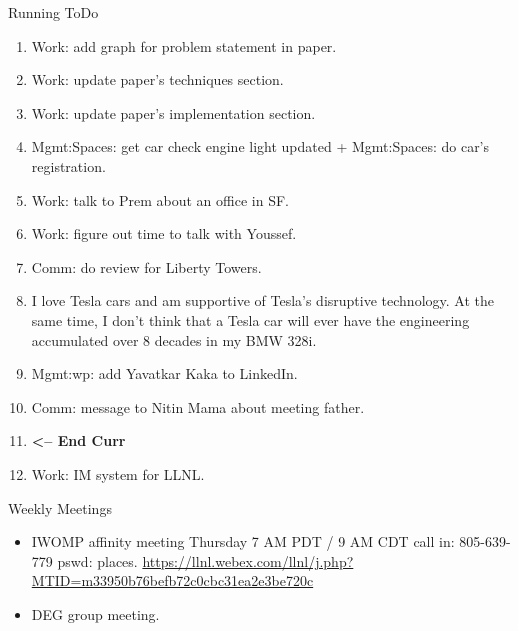 \begin{columns}
\begin{column}{0.5\linewidth}
\begin{block}{Running ToDo}
\begin{enumerate}
          \item \tiny Work: add graph for problem statement in paper. 
          \item \tiny Work: update paper's techniques section. 
          \item \tiny Work: update paper's implementation section. 
          \item \tiny Mgmt:Spaces: get car check engine light updated + Mgmt:Spaces: do car's
            registration. 

          \item \tiny Work: talk to Prem about an office in SF. 
          \item \tiny Work: figure out time to talk with Youssef.

          \item \tiny Comm: do review for Liberty Towers.

          \item \tiny I love Tesla cars and am supportive of Tesla’s 
            disruptive technology. At the same time, I don’t think
            that a Tesla car will ever have the engineering
            accumulated over 8 decades in my BMW 328i.

            \item \tiny Mgmt:wp: add Yavatkar Kaka to LinkedIn. 

          \item \tiny Comm: message to Nitin Mama about meeting father.
                    
  
\item \tiny \textbf{ <-- End Curr } 

\item \tiny Work: IM system for LLNL. 

        \end{enumerate}
      \end{block}
 

      \begin{block}{Weekly Meetings}
        \begin{itemize}
          \tiny \item \tiny IWOMP affinity meeting Thursday 7 AM PDT / 9 AM
          CDT call in: 805-639-779 pswd: places. \url{https://llnl.webex.com/llnl/j.php?MTID=m33950b76befb72c0cbc31ea2e3be720c}
        \item \tiny DEG group meeting.  
        \end{itemize}
      \end{block} 



\end{column}
\end{columns}
